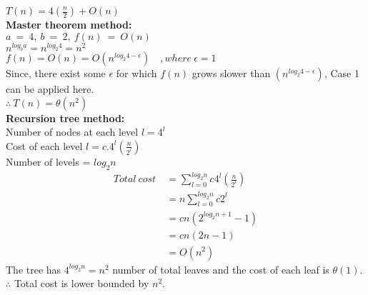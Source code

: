 \documentclass[12pt,twoside]{article}
\begin{document}


\begin{problems}

\problem  %

\begin{problemparts}
\problempart %

$T(n) = 4(\frac{n}{2}) + O(n)$ \\

\textbf{Master theorem method:} \\
$a\ =\ 4,\ b\ =\ 2,\ f(n)\ =\ O(n)$ \\
$n^{log_b a} = n^{log_2 4} = n^2$ \\
$f(n) = O(n) = O(n^{log_2 4 - \epsilon}) \quad ,where\ \epsilon = 1$ \\
Since, there exist some $\epsilon$ for which $f(n)$ grows slower than $(n^{log_2 4 - \epsilon})$, Case 1 can be applied here.\\
$\therefore\ T(n) = \theta(n^2)$ \\

\textbf{Recursion tree method:} \\
Number of nodes at each level $l = 4^l$ \\
Cost of each level $l = c. 4^l \left( \frac{n}{2^l}\right)$ \\
Number of levels = $log_2 n$
\begin{align*}
    Total\ cost\ &= \sum_{l=0}^{log_2 n} c 4^l \left( \frac{n}{2^l} \right) \\
                 &= n \sum_{l=0}^{log_2 n} c 2^l \\
                 &= cn \left( 2^{log_2 n + 1} - 1\right) \\
                 &= cn (2n - 1) \\
                 &= O(n^2) 
\end{align*}
The tree has $4^{log_2 n} = n^2$ number of total leaves and the cost of each leaf is $\theta(1)$. \\
$\therefore$ Total cost is lower bounded by $n^2$.


\end{problemparts}
\end{problems}
\end{document}
